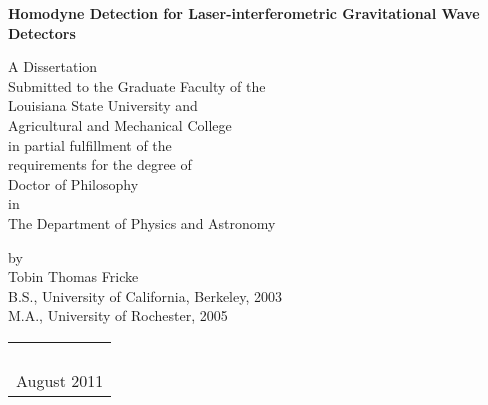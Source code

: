 \thispagestyle{empty}
\begin{center}
\textbf{Homodyne Detection for Laser-interferometric Gravitational Wave Detectors}
\vspace{1.75in}

A Dissertation\\
\vspace{1ex}
Submitted to the Graduate Faculty of the\\
Louisiana State University and\\
Agricultural and Mechanical College\\
in partial fulfillment of the\\
requirements for the degree of\\
Doctor of Philosophy\\
\vspace{1ex}
in\\
\vspace{1ex}
The Department of Physics and Astronomy\\
\vspace{1in}
\texttt{\color{red}{Compiled \today}}
\vspace{0.75in}

by\\
Tobin Thomas Fricke \\
B.S., University of California, Berkeley, 2003\\
M.A., University of Rochester, 2005 \\

\begin{tabular}{c}
\\
\\
\\
\\
\\
August 2011
\end{tabular}

\end{center}

